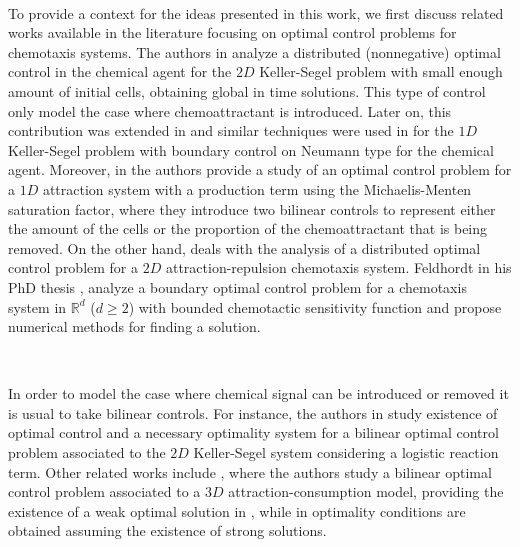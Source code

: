 \documentclass[11pt]{article}
\numberwithin{theorem}{section}
\begin{document}
\

To provide a context for the ideas presented in this work, we first discuss related works available in the literature focusing on  optimal control  problems for chemotaxis systems.
 The authors in \cite{RY01} analyze a distributed (nonnegative) optimal control in the chemical agent for the $2D$ Keller-Segel problem with small enough  amount of initial cells, obtaining global in time solutions. This type of control only model the case where  chemoattractant is introduced.
Later on,   this contribution was extended in  \cite{R03,R04} and  similar techniques were  used in \cite{R08,R13} 
for the $1D$ Keller-Segel problem with  boundary  control on Neumann type  for the chemical agent. Moreover, in \cite{FMcC03} the authors provide a study of an optimal control problem for a $1D$ attraction system with a  production term using the Michaelis-Menten saturation factor, where they introduce two bilinear controls to represent either the amount of the cells or the proportion of the chemoattractant that is being  removed.  On the other hand, \cite{LiuYuan21} deals with the analysis of a distributed optimal control problem for a $2D$ attraction-repulsion chemotaxis system. 
Feldhordt in his PhD thesis \cite{Feldhordt}, 
analyze a boundary optimal control problem for a chemotaxis system in $\mathbb{R}^d$ ($d\geq2$)  with bounded chemotactic sensitivity function and propose numerical methods for finding a solution.

\

 In order to model the case where chemical signal can be introduced or removed it is usual to take bilinear controls.  For instance, the authors in \cite{Braz-KS-logistic} study existence of optimal control and a necessary optimality system for a bilinear optimal control problem associated to the $2D$ Keller-Segel system considering a logistic reaction term.
Other related works include \cite{Andre-KS-consumo,Andre-KS-consumo-weak}, where the authors study a bilinear optimal control problem associated to a $3D$ attraction-consumption model, providing the existence of a weak optimal solution in \cite{Andre-KS-consumo-weak}, while in \cite{Andre-KS-consumo} optimality conditions are obtained assuming the existence of  strong solutions. %
\end{document}
